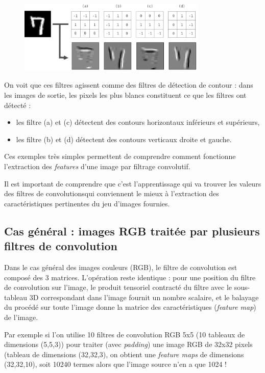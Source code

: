 \documentclass{article}
\begin{document}
\begin{figure}[H]
\centering
\includegraphics[width=0.8\textwidth]{img/7_mnist_4_filtres.png}
\end{figure}

On voit que ces filtres agissent comme des filtres de détection de contour : 
dans les images de sortie, les pixels les plus blancs constituent ce que les filtres ont détecté :

\begin{itemize}
\item les filtre (a) et (c) détectent des contours horizontaux inférieurs et supérieurs,
\item les filtre (b) et (d) détectent des contours verticaux droite et gauche.
\end{itemize}

Ces exemples très simples permettent de comprendre comment fonctionne l'extraction des
\textit{features} d'une image par filtrage convolutif.

Il est important de comprendre que c'est l'apprentissage qui va trouver 
les valeurs des filtres de convolutionsqui conviennent le mieux à 
l'extraction des caractéristiques pertinentes du jeu d'images fournies.

\subsection{Cas général : images RGB traitée par plusieurs filtres de convolution}


Dans le cas général des images couleurs (RGB), le filtre de convolution est composé des 3 matrices. 
L'opération reste identique : pour une position du filtre de convolution sur l'image, 
le produit tensoriel contracté du filtre avec le sous-tableau 3D correspondant 
dans l'image fournit un nombre scalaire, et le balayage du procédé sur toute l'image 
donne la matrice des caractéristiques (\textit{feature map}) de l'image. 

Par exemple si l'on utilise 10 filtres de convolution RGB 5x5 (10 tableaux de dimensions (5,5,3)) 
pour traiter (avec  \textit{padding}) une image RGB de 32x32 pixels 
(tableau de dimensions (32,32,3), on obtient une \textit{feature maps} de dimensions (32,32,10), 
soit 10240 termes alors que l'image source n'en a que 1024 !
\end{document}
